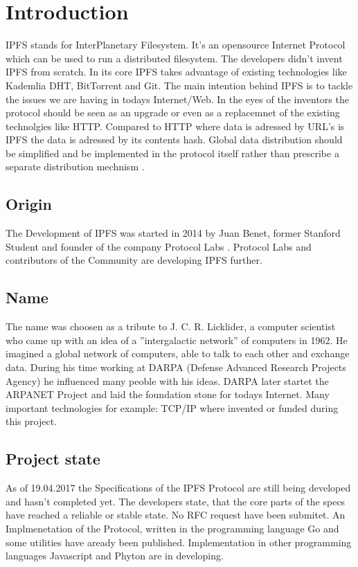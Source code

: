 \documentclass[a4paper,11pt, oneside]{report}
\theoremstyle{definition}
\begin{document}
\chapter{Introduction}
IPFS stands for InterPlanetary Filesystem. It's an opensource Internet Protocol which can be used to run a distributed filesystem.
The developers didn't invent IPFS from scratch. In its core IPFS takes advantage of existing technologies like Kademlia DHT, BitTorrent and Git. The main intention behind IPFS is to tackle the issues  we are having in todays Internet/Web. In the eyes of the inventors the protocol should be seen as an upgrade or even as a replacemnet of the existing technolgies like HTTP. Compared to HTTP where data is adressed by URL's is IPFS the data is adressed by its contents hash. Global data distribution should be simplified and be implemented in the protocol itself rather than prescribe a separate distribution mechnism \cite{IPFSBasics}.

\section{Origin}
The Development of IPFS was started in 2014 by Juan Benet, former Stanford Student and founder of the company Protocol Labs . Protocol Labs and contributors of the Community are developing IPFS further.

\section{Name}
The name was choosen as a tribute to J. C. R. Licklider, a computer scientist who came up with an idea of a ''intergalactic network'' of computers in 1962. He imagined a global network of computers, able to talk to each other and exchange data. During his time working at DARPA (Defense Advanced Research Projects Agency) he influenced many peoble with his ideas. DARPA later startet the ARPANET Project and laid the foundation stone for todays Internet. Many important technologies for example: TCP/IP where invented or funded during this project. 

\newpage
\section{Project state}
As of 19.04.2017 the Specifications of the IPFS Protocol are still being developed and hasn't completed yet. The developers state, that the
 core parts of the specs have reached a reliable or stable state. No RFC request have been submitet. An Implmenetation of the Protocol, written in the programming language Go and some utilities have aready been published. Implementation in other programming languages Javascript and Phyton are in developing.\\
\end{document}
